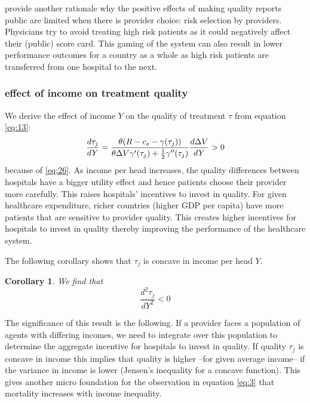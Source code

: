 \documentclass[a4paper,12pt]{article}
\newtheorem{corollary}{Corollary}
\begin{document}
\cite{dranoveReportCards2003} provide another rationale why the positive effects of making quality reports public are limited when there is provider choice: risk selection by providers. Physicians try to avoid treating high risk patients as it could negatively affect their (public) score card. This gaming of the system can also result in lower performance outcomes for a country as a whole as high risk patients are transferred from one hospital to the next.

\subsubsection{effect of income on treatment quality}
\label{sec:orge3eda9d}

We derive the effect of income \(Y\) on the quality of treatment \(\tau\) from equation \eqref{eq:13}: 
\begin{equation}
\label{eq:29}
\frac{d\tau_j}{dY} = \frac{\theta (R-c_s-\gamma(\tau_j))}{\theta \Delta V \gamma'(\tau_j) + \textstyle{1\over 2} \gamma''(\tau_j) } \frac{d\Delta V}{dY} > 0
\end{equation}
because of \eqref{eq:26}. As income per head increases, the quality differences between hospitals have a bigger utility effect and hence patients choose their provider more carefully. This raises hospitals' incentives to invest in quality. For given healthcare expenditure, richer countries (higher GDP per capita) have more patients that are sensitive to provider quality. This creates higher incentives for hospitals to invest in quality thereby improving the performance of the healthcare system.

The following corollary shows that \(\tau_j\) is concave in income per head \(Y\).

\begin{corollary}
\label{cor:tauY}
We find that
\begin{equation}
\label{eq:23}
\frac{d^2 \tau_j}{dY^2} < 0
\end{equation}
\end{corollary}

The significance of this result is the following. If a provider faces a population of agents with differing incomes, we need to integrate over this population to determine the aggregate incentive for hospitals to invest in quality. If quality \(\tau_j\) is concave in income this implies that quality is higher --for given average income-- if the variance in income is lower (Jensen's inequality for a concave function). This gives another micro foundation for the observation in equation \eqref{eq:3} that mortality increases with income inequality.
\end{document}
